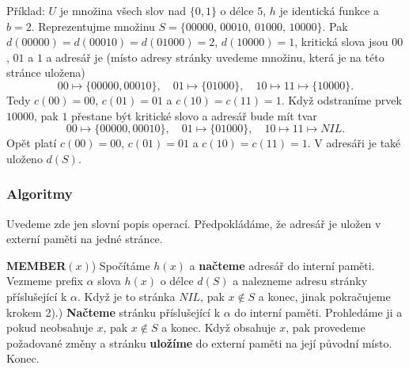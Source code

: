 \documentclass[a4paper,12pt]{article}
\begin{document}
Příklad: $U$ je množina všech slov nad $\{
0,1\}$ o 
délce $5$, $h$ 
je identická funkce a $b=2$. Reprezentujme množinu  
$S=\{00000,\,00010,\,01000,\,10000\}$. Pak 
$d(00000)=d(00010)=d(01000)=2$, $d(10000)=1$, kritická slova 
jsou $00$, $01$ a $1$ a adresář je (místo adresy stránky 
uvedeme množinu, která je na této stránce uložena)
$$00\mapsto \{00000,00010\},\quad 01\mapsto \{01000\},\quad 10\mapsto 
11\mapsto \{10000\}.$$
Tedy $c(00)=00$, $c(01)=01$ a $c(10)=c(11)=1$.
Když odstraníme prvek $10000$, pak $1$ přestane být kritické 
slovo a adresář bude mít tvar
$$00\mapsto \{00000,00010\},\quad 01\mapsto \{01000\},\quad 10\mapsto 
11\mapsto NIL.$$
Opět platí $c(00)=00$, $c(01)=01$ a $c(10)=c(11)=1$.
V adresáři je také uloženo $d(S)$.

\subsubsection{Algoritmy}


Uvedeme zde jen slovní popis operací. Předpokládáme, že adresář 
je uložen v externí paměti na jedné stránce.

{\bf MEMBER$(x)$}) Spočítáme $h(x)$ a {\bf načteme} adresář do interní paměti. 
Vez\-me\-me prefix $\alpha$ slova $h(x)$ o délce $d(S)$ a nalezneme 
adresu stránky příslušející k $\alpha$. Když je to stránka 
$NIL$, pak $x\notin S$ a konec, jinak pokračujeme krokem 
2).) {\bf Načteme} stránku příslušející k $\alpha$ do interní 
paměti. Prohle\-dá\-me ji a pokud neobsahuje $x$, pak $x\notin 
S$ a 
konec. Když obsahuje $x$, pak provedeme požadované 
změny a stránku {\bf ulo\-ží\-me} do externí paměti na její 
původní místo. Konec.
\end{document}
